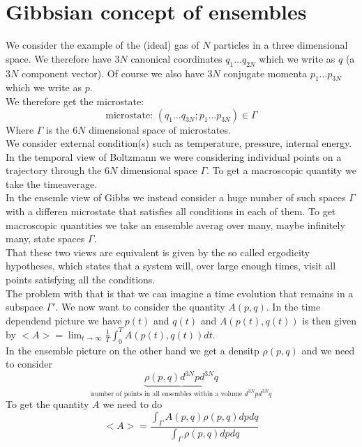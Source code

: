 \documentclass{report}
\begin{document}
\section{Gibbsian concept of ensembles}
We consider the example of the (ideal) gas of $N$ particles in a three dimensional space. We therefore have $3N$ canonical coordinates $q_1 \ldots q_{2N}$ which we write as $q$ (a $3N$ component vector). Of course we also have $3N$ conjugate momenta $p_1 \ldots p_{3N}$ which we write as $p$.\\
We therefore get the microstate: \[
  \text{microstate: } \left( q_1 \ldots q_{3N} ; p_1 \ldots p_{3N} \right) \in \Gamma
\] Where $\Gamma$ is the $6N$ dimensional space of microstates.\\
We consider external condition(s) such as temperature, pressure, internal energy.\\
In the temporal view of Boltzmann we were considering individual points on a trajectory through the $6N$ dimensional space $\Gamma$. To get a macroscopic quantity we take the timeaverage.\\
In the ensemle view of Gibbs we instead consider a huge number of such spaces $\Gamma$ with a differen microstate that satisfies all conditions in each of them. To get macroscopic quantities we take an ensemble averag over many, maybe infinitely many, state spaces $\Gamma$.\\
That these two views are equivalent is given by the so called ergodicity hypotheses, which states that a system will, over large enough times, visit all points satisfying all the conditions.\\
The problem with that is that we can imagine a time evolution that remains in a subspace $\Gamma'$. 
We now want to consider the quantity $A\left( p, q \right) $. In the time dependend picture we have $p\left( t \right) $ and $q\left( t \right) $ and $A\left( p\left( t \right) , q\left( t \right)  \right) $ is then given by $<A> = \lim_{t\to \infty} \frac{1}{T} \int_0^T A\left( p\left( t \right) ,q\left( t \right)  \right) dt$.\\
In the ensemble picture on the other hand we get a densitp $\rho\left( p, q \right) $ and we need to consider \[
  \underbrace{\rho\left( p,q \right)d^{3N}p d^{3N}q}_{\text{number of points in all ensembles within a volume $d^{3N}p d^{3N}q$}}
\] To get the quantity $A$ we need to do \[
<A> = \frac{\int_\Gamma A\left( p,q \right) \rho\left( p,q \right) dp dq}{\int_\Gamma \rho\left( p,q \right) dp dq}
\] 
\end{document}
